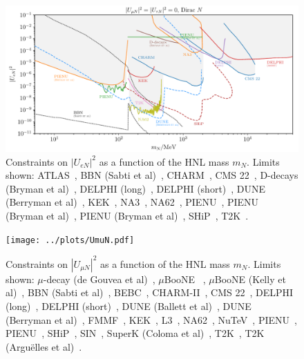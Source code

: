 \documentclass{revtex4-2}%
\begin{document}
%
\normalsize%


\begin{figure}[h!]%
\centering%
\includegraphics[width=1\textwidth]{../plots/UeN.pdf}%
\caption{Constraints on $|U_{e N}|^2$ as a function of the HNL mass $m_N$. Limits shown: ATLAS~\cite{ATLAS:2019kpx}, BBN (Sabti et al)~\cite{Sabti:2020yrt}, CHARM~\cite{CHARM:1985nku}, CMS 22~\cite{CMS:2022fut}, D-decays (Bryman et al)~\cite{Bryman:2019bjg}, DELPHI (long)~\cite{DELPHI:1996qcc}, DELPHI (short)~\cite{DELPHI:1996qcc}, DUNE (Berryman et al)~\cite{Berryman:2019dme}, KEK~\cite{Asano:1981he}, NA3~\cite{NA3:1986ahv}, NA62~\cite{NA62:2020mcv}, PIENU~\cite{Britton:1992xv}, PIENU (Bryman et al)~\cite{Bryman:2019bjg}, PIENU (Bryman et al)~\cite{Bryman:2019bjg}, SHiP~\cite{SHiP:2018xqw}, T2K~\cite{T2K:2019jwa}.}%
\end{figure}

%


\begin{figure}[h!]%
\centering%
\texttt{[image: ../plots/UmuN.pdf]}%
\caption{Constraints on $|U_{\mu N}|^2$ as a function of the HNL mass $m_N$. Limits shown: $\mu$-decay (de Gouvea et al)~\cite{deGouvea:2015euy}, $\mu$BooNE ~\cite{MicroBooNE:2019izn}, $\mu$BooNE (Kelly et al)~\cite{Kelly:2021xbv}, BBN (Sabti et al)~\cite{Sabti:2020yrt}, BEBC~\cite{WA66:1985mfx}, CHARM-II~\cite{CHARMII:1994jjr}, CMS 22~\cite{CMS:2022fut}, DELPHI (long)~\cite{DELPHI:1996qcc}, DELPHI (short)~\cite{DELPHI:1996qcc}, DUNE (Ballett et al)~\cite{Ballett:2019bgd}, DUNE (Berryman et al)~\cite{Berryman:2019dme}, FMMF~\cite{FMMF:1994yvb,}, KEK~\cite{Asano:1981he}, L3~\cite{L3:2001zfe}, NA62~\cite{NA62:2021bji}, NuTeV~\cite{NuTeV:1999kej}, PIENU~\cite{PIENU:2019usb}, PIENU~\cite{PIENU:2019usb}, SHiP~\cite{SHiP:2018xqw}, SIN~\cite{Daum:1987bg}, SuperK (Coloma et al)~\cite{Coloma:2019htx}, T2K~\cite{T2K:2019jwa}, T2K (Argu\"elles et al)~\cite{Arguelles:2021dqn}.}%
\end{figure}
\end{document}
